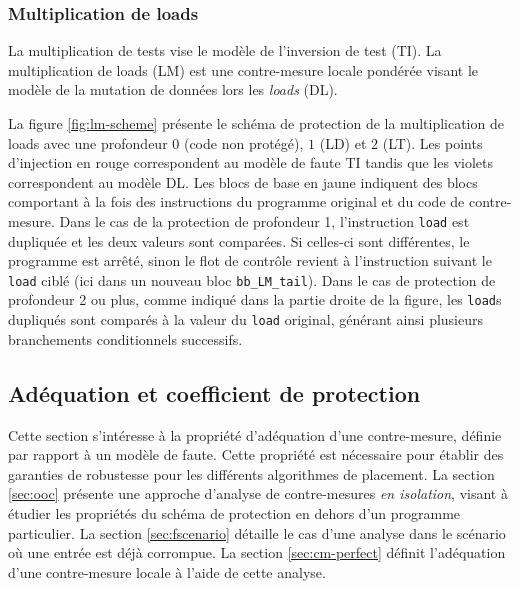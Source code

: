             \subsubsection{Multiplication de loads}
            \label{sec:cm-load-mult}
            
                La multiplication de tests vise le modèle de l'inversion de test (\gls{TI}). La multiplication de loads (\gls{LM}) est une contre-mesure locale pondérée visant le modèle de la mutation de données lors les \textit{loads} (\gls{DL}).
                
                La figure \ref{fig:lm-scheme} présente le schéma de protection de la multiplication de loads avec une profondeur $0$ (code non protégé), $1$ (\gls{LD}) et $2$ (\gls{LT}).
                Les points d'injection en rouge correspondent au modèle de faute \gls{TI} tandis que les violets correspondent au modèle \gls{DL}.
                Les blocs de base en jaune indiquent des blocs comportant à la fois des instructions du programme original et du code de contre-mesure.
                Dans le cas de la protection de profondeur 1, l'instruction \texttt{load} est dupliquée et les deux valeurs sont comparées. Si celles-ci sont différentes, le programme est arrêté, sinon le flot de contrôle revient à l'instruction suivant le \texttt{load} ciblé (ici dans un nouveau bloc \texttt{bb\_LM\_tail}). 
                Dans le cas de protection de profondeur 2 ou plus, comme indiqué dans la partie droite de la figure, les \texttt{load}s dupliqués sont comparés à la valeur du \texttt{load} original, générant ainsi plusieurs branchements conditionnels successifs.
            
        \subsection{Adéquation et coefficient de protection}
        \label{sec:cm-perfection}
        
            Cette section s'intéresse à la propriété d'adéquation d'une contre-mesure, définie par rapport à un modèle de faute.
            Cette propriété est nécessaire pour établir des garanties de robustesse pour les différents algorithmes de placement.
            La section \ref{sec:ooc} présente une approche d'analyse de contre-mesures \textit{en isolation}, visant à étudier les propriétés du schéma de protection en dehors d'un programme particulier.
            La section \ref{sec:fscenario} détaille le cas d'une analyse dans le scénario où une entrée est déjà corrompue.
            La section \ref{sec:cm-perfect} définit l'adéquation d'une contre-mesure locale à l'aide de cette analyse.
            
